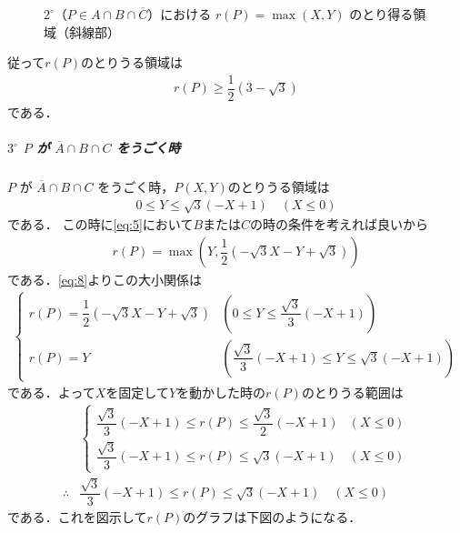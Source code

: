 \documentclass[../../main.tex]{subfiles}
\begin{document}
\begin{figure}[htb]
  \caption{$2^\circ$（$P \in A \cap B \cap \overline{C}$）における $r(P) = \max(X, Y)$ のとり得る領域（斜線部）}
  \label{fig:case2_rP_region}
\end{figure}

従って$r(P)$のとりうる領域は
\begin{align}
  r(P) \ge \dfrac{1}{2}(3 - \sqrt{3}) \label{eq:9}
\end{align}
である．

\subparagraph{$3^\circ$ $P$ が $\overline{A} \cap B \cap C$ をうごく時}

$P$ が $\overline{A} \cap B \cap C$ をうごく時，$P(X,Y)$のとりうる領域は
\begin{align}
  0 \le Y \le \sqrt{3}(-X+1) \quad (X \le 0)
\end{align}
である．
この時に\cref{eq:5}において$B$または$C$の時の条件を考えれば良いから
\begin{align}
  r(P) = \max\left(Y, \dfrac{1}{2}(-\sqrt{3}X - Y + \sqrt{3})\right)
\end{align}
である．\cref{eq:8}よりこの大小関係は
\begin{align}
  \begin{cases}
    r(P) = \dfrac{1}{2}(-\sqrt{3}X - Y + \sqrt{3}) & \left(0 \le Y \le \dfrac{\sqrt{3}}{3}(-X+1) \right) \\
    r(P) = Y & \left(\dfrac{\sqrt{3}}{3}(-X+1) \le Y \le \sqrt{3}(-X+1) \right)
  \end{cases}
\end{align}
である．よって$X$を固定して$Y$を動かした時の$r(P)$のとりうる範囲は
\begin{align}
  &
  \begin{cases}
    \dfrac{\sqrt{3}}{3}(-X + 1) \le r(P) \le \dfrac{\sqrt{3}}{2}(-X + 1) & (X \le 0) \\
    \dfrac{\sqrt{3}}{3}(-X+1) \le r(P) \le \sqrt{3}(-X+1) & (X \le 0)
  \end{cases} \\
  \therefore
  & \dfrac{\sqrt{3}}{3}(-X+1) \le r(P) \le \sqrt{3}(-X+1) \quad (X \le 0)
\end{align}
である．これを図示して$r(P)$のグラフは下図のようになる．
\end{document}
